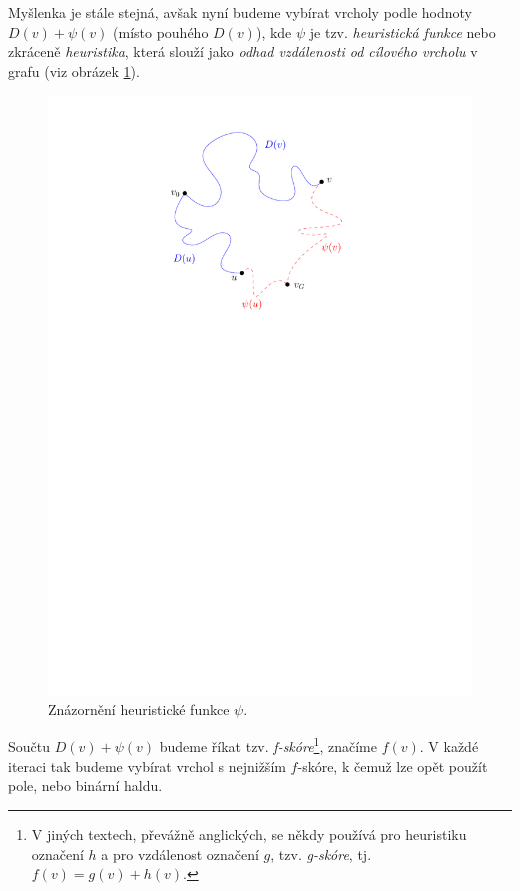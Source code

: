 Myšlenka je stále stejná, avšak nyní budeme vybírat vrcholy podle hodnoty $D(v)+\psi(v)$ (místo pouhého $D(v)$), kde $\psi$ je tzv. \emph{heuristická funkce} nebo zkráceně \emph{heuristika}, která slouží jako \emph{odhad vzdálenosti od cílového vrcholu} v grafu (viz obrázek \ref{fig:astar_heuristika}).
\begin{figure}[h]
    \centering
    \includegraphics[scale=\graphimgsize]{01-grafalgo/images/ch01_astar_heuristika.pdf}
    \caption{Znázornění heuristické funkce $\psi$.}
    \label{fig:astar_heuristika}
\end{figure}
Součtu $D(v)+\psi(v)$ budeme říkat tzv. \emph{f-skóre}\footnote{V jiných textech, převážně anglických, se někdy používá pro heuristiku označení $h$ a pro vzdálenost označení $g$, tzv. \emph{g-skóre}, tj. $f(v)=g(v)+h(v)$.}, značíme $f(v)$. V každé iteraci tak budeme vybírat vrchol s nejnižším $f$-skóre, k čemuž lze opět použít pole, nebo binární haldu.

